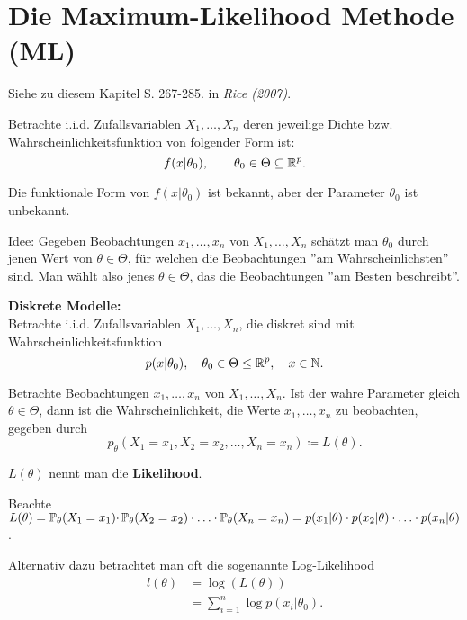 \documentclass{tstextbook}
\begin{document}
\section{Die Maximum-Likelihood Methode (ML)}

\begin{book}
	Siehe zu diesem Kapitel S. 267-285. in	\textit{Rice (2007)}.
\end{book}


Betrachte i.i.d. Zufallsvariablen $ X_1,\ldots,X_n $ deren jeweilige Dichte bzw. Wahrscheinlichkeitsfunktion von folgender Form ist: 
\[
f(x|\theta_0), \qquad \theta_0 \in \Theta \subseteq \mathbb R^p.
\]

Die funktionale Form von $ f(x|\theta_0) $ ist bekannt, aber der Parameter $ \theta_0 $ ist unbekannt. 

\begin{remark}
	Idee: Gegeben Beobachtungen $ x_1,\ldots,x_n $ von $ X_1,\ldots,X_n $ schätzt man $ \theta_0 $ durch jenen Wert von $ \theta\in\Theta $, für welchen die Beobachtungen ''am Wahrscheinlichsten'' sind. Man wählt also jenes $ \theta\in\Theta $, das die Beobachtungen ''am Besten beschreibt''. 
\end{remark}

	
\textbf{Diskrete Modelle:} \\

Betrachte i.i.d.  Zufallsvariablen $ X_1,\ldots,X_n $, die diskret sind mit Wahrscheinlichkeitsfunktion 
\[
p(x|\theta_0), \quad \theta_0\in\Theta \leq \mathbb R^p, \quad x\in\mathbb N.
\]

Betrachte Beobachtungen $ x_1,\ldots,x_n $ von $ X_1,\ldots,X_n $. Ist der wahre Parameter gleich $ \theta\in\Theta $, dann ist die Wahrscheinlichkeit, die Werte $ x_1,\ldots,x_n $ zu beobachten, gegeben durch 
\[
p_\theta \left(X_1=x_1,X_2=x_2,\ldots,X_n=x_n\right) \coloneqq L(\theta).
\]

$ L(\theta) $ nennt man die \textbf{Likelihood}. 

Beachte $ L(\theta) = \mathbb P_{\theta}(X_1=x_1)\cdotp \mathbb P_{\theta}(X_2=x_2)\cdot\ldots\cdot \mathbb P_{\theta}(X_n=x_n) = p(x_1|\theta)\cdot p(x_2|\theta)\cdot\ldots\cdot p(x_n|\theta) $.

Alternativ dazu betrachtet man oft die sogenannte Log-Likelihood
\[\begin{aligned}
	l(\theta) & = \log(L(\theta)) \\
	& = \sum_{i=1}^{n}\log p(x_i|\theta_0).
\end{aligned}
\]
\end{document}
